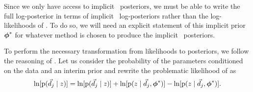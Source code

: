 
Since we only have access to implicit \pz\ posteriors, we must be able to write the full log-posterior in terms of implicit \pz\ log-posteriors rather than the log-likelihoods of .
To do so, we will need an explicit statement of this implicit prior ${\boldsymbol{\phi}}^{*}$ for whatever method is chosen to produce the implicit \pz\ posteriors.  

To perform the necessary transformation from likelihoods to posteriors, we follow the reasoning of \citet{Foreman-Mackey2014}.  
Let us consider the probability of the parameters conditioned on the data and an interim prior and rewrite the problematic likelihood of  as 
\begin{equation}
\eqlabel{eqn:trick}
\ln[\pr{\data_{j} \gvn z}] = \ln[\pr{\data_{j} \gvn z}] + \ln[\pr{z \gvn \data_{j}, \ndphi^{*}}] - \ln[\pr{z \gvn \data_{j}, \ndphi^{*}}].
\end{equation}


